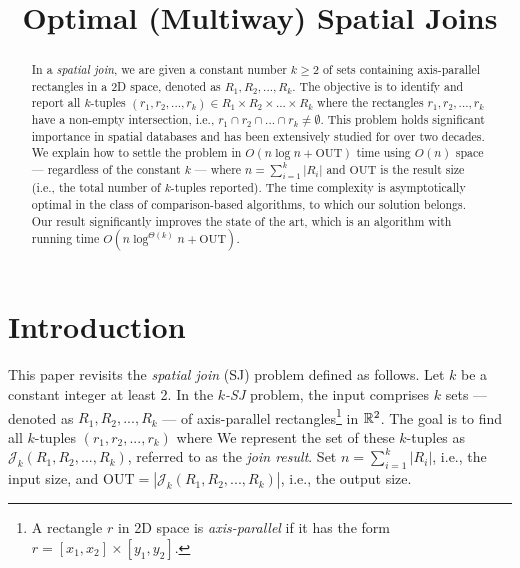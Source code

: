 \documentclass[sigconf]{acmart}
\def\J{\mathcal{J}}
\def\out{\mathrm{OUT}}
\begin{document}
    
\title{Optimal (Multiway) Spatial Joins}


\author{}


\begin{abstract}
    In a {\em spatial join}, we are given a constant number $k \geq 2$ of sets containing axis-parallel rectangles in a 2D space, denoted as $R_1, R_2, ..., R_k$. The objective is to identify and report all $k$-tuples $(r_1, r_2, ..., r_k) \in R_1 \times R_2 \times ... \times R_k$ where the rectangles $r_1, r_2, ..., r_k$ have a non-empty intersection, i.e., $r_1 \cap r_2 \cap ... \cap r_k \neq \emptyset$. This problem holds significant importance in spatial databases and has been extensively studied for over two decades. We explain how to settle the problem in $O(n \log n + \out)$ time using $O(n)$ space --- regardless of the constant $k$ --- where $n = \sum_{i=1}^k |R_i|$ and $\out$ is the result size (i.e., the total number of $k$-tuples reported). The time complexity is asymptotically optimal in the class of comparison-based algorithms, to which our solution belongs. Our result significantly improves the state of the art, which is an algorithm with running time $O(n \log^{\Theta(k)} n + \out)$.
\end{abstract}

\maketitle 

\section{Introduction} \label{sec:intro}

This paper revisits the {\em spatial join} (SJ) problem defined as follows. Let $k$ be a constant integer at least 2. In the {\em $k$-SJ} problem, the input comprises $k$ sets --- denoted as $R_1, R_2, ..., R_k$ --- of axis-parallel rectangles\footnote{A rectangle $r$ in 2D space is {\em axis-parallel} if it has the form $r = [x_1, x_2] \times [y_1, y_2]$.} in $\mathbb{R}^2$. The goal is to find all $k$-tuples $(r_1, r_2, ..., r_k)$ where
We represent the set of these $k$-tuples as $\J_k(R_1, R_2, ..., R_k)$, referred to as the {\em join result}. Set $n = \sum_{i=1}^k |R_i|$, i.e., the input size, and $\out = |\J_k(R_1, R_2, ..., R_k)|$, i.e., the output size.
\end{document}
